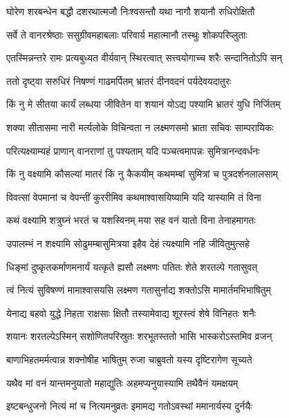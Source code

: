 
\twolineshloka
{घोरेण शरबन्धेन बद्धौ दशरथात्मजौ}
{निःश्वसन्तौ यथा नागौ शयानौ रुधिरोक्षितौ} %

\twolineshloka
{सर्वे ते वानरश्रेष्ठाः ससुग्रीवमहाबलाः}
{परिवार्य महात्मानौ तस्थुः शोकपरिप्लुताः} %

\twolineshloka
{एतस्मिन्नन्तरे रामः प्रत्यबुध्यत वीर्यवान्}
{स्थिरत्वात् सत्त्वयोगाच्च शरैः सन्दानितोऽपि सन्} %

\twolineshloka
{ततो दृष्ट्वा सरुधिरं निषण्णं गाढमर्पितम्}
{भ्रातरं दीनवदनं पर्यदेवयदातुरः} %

\twolineshloka
{किं नु मे सीतया कार्यं लब्धया जीवितेन वा}
{शयानं योऽद्य पश्यामि भ्रातरं युधि निर्जितम्} %

\twolineshloka
{शक्या सीतासमा नारी मर्त्यलोके विचिन्वता}
{न लक्ष्मणसमो भ्राता सचिवः साम्परायिकः} %

\twolineshloka
{परित्यक्ष्याम्यहं प्राणान् वानराणां तु पश्यताम्}
{यदि पञ्चत्वमापन्नः सुमित्रानन्दवर्धनः} %

\twolineshloka
{किं नु वक्ष्यामि कौसल्यां मातरं किं नु कैकयीम्}
{कथमम्बां सुमित्रां च पुत्रदर्शनलालसाम्} %

\twolineshloka
{विवत्सां वेपमानां च वेपन्तीं कुररीमिव}
{कथमाश्वासयिष्यामि यदि यास्यामि तं विना} %

\twolineshloka
{कथं वक्ष्यामि शत्रुघ्नं भरतं च यशस्विनम्}
{मया सह वनं यातो विना तेनाहमागतः} %

\twolineshloka
{उपालम्भं न शक्ष्यामि सोढुमम्बासुमित्रया}
{इहैव देहं त्यक्ष्यामि नहि जीवितुमुत्सहे} %

\twolineshloka
{धिङ्मां दुष्कृतकर्माणमनार्यं यत्कृते ह्यसौ}
{लक्ष्मणः पतितः शेते शरतल्पे गतासुवत्} %

\twolineshloka
{त्वं नित्यं सुविषण्णं मामाश्वासयसि लक्ष्मण}
{गतासुर्नाद्य शक्तोऽसि मामार्तमभिभाषितुम्} %

\twolineshloka
{येनाद्य बहवो युद्धे निहता राक्षसाः क्षितौ}
{तस्यामेवाद्य शूरस्त्वं शेषे विनिहतः शनैः} %

\twolineshloka
{शयानः शरतल्पेऽस्मिन् सशोणितपरिस्रुतः}
{शरभूतस्ततो भासि भास्करोऽस्तमिव व्रजन्} %

\twolineshloka
{बाणाभिहतमर्मत्वान्न शक्नोषीह भाषितुम्}
{रुजा चाब्रुवतो यस्य दृष्टिरागेण सूच्यते} %

\twolineshloka
{यथैव मां वनं यान्तमनुयातो महाद्युतिः}
{अहमप्यनुयास्यामि तथैवैनं यमक्षयम्} %

\twolineshloka
{इष्टबन्धुजनो नित्यं मां च नित्यमनुव्रतः}
{इमामद्य गतोऽवस्थां ममानार्यस्य दुर्नयैः} %

